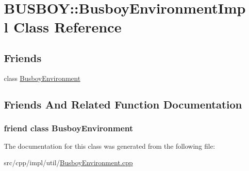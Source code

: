 \hypertarget{classBUSBOY_1_1BusboyEnvironmentImpl}{
\section{BUSBOY::BusboyEnvironmentImpl Class Reference}
\label{classBUSBOY_1_1BusboyEnvironmentImpl}
}
\subsection*{Friends}
\begin{DoxyCompactItemize}
\item 
class \hyperlink{classBUSBOY_1_1BusboyEnvironmentImpl_ac40d06d4f5fe44be5340245ffc5d38d0}{BusboyEnvironment}
\end{DoxyCompactItemize}


\subsection{Friends And Related Function Documentation}
\hypertarget{classBUSBOY_1_1BusboyEnvironmentImpl_ac40d06d4f5fe44be5340245ffc5d38d0}{
\subsubsection[{BusboyEnvironment}]{\setlength{\rightskip}{0pt plus 5cm}friend class {\bf BusboyEnvironment}}}
\label{classBUSBOY_1_1BusboyEnvironmentImpl_ac40d06d4f5fe44be5340245ffc5d38d0}


The documentation for this class was generated from the following file:\begin{DoxyCompactItemize}
\item 
src/cpp/impl/util/\hyperlink{BusboyEnvironment_8cpp}{BusboyEnvironment.cpp}\end{DoxyCompactItemize}
